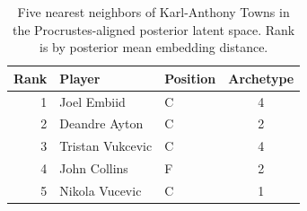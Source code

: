 \begin{table}[htbp]
  \centering\small
  \begin{tabular}{rllc}
    \toprule
    Rank & Player & Position & Archetype \\
    \midrule
    1 & Joel Embiid & C & 4 \\
    2 & Deandre Ayton & C & 2 \\
    3 & Tristan Vukcevic & C & 4 \\
    4 & John Collins & F & 2 \\
    5 & Nikola Vucevic & C & 1 \\
    \bottomrule
  \end{tabular}
  \caption{Five nearest neighbors of Karl-Anthony Towns in the Procrustes-aligned posterior latent space. Rank is by posterior mean embedding distance.}
  \label{tab:Karl_Anthony_Towns_neighbors}
\end{table}

